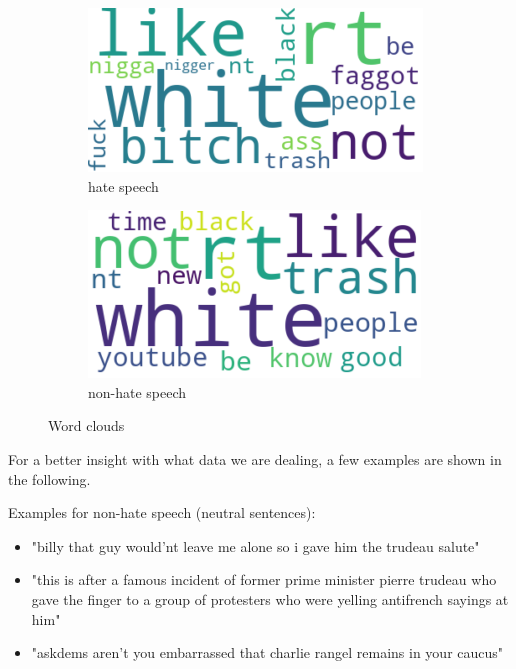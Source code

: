 \begin{figure}[ht]
    \hfill
    \begin{subfigure}[b]{0.4\textwidth}
        \centering
        \includegraphics[width=\textwidth]{figures/Wordcloud-HateSpeech-tokens.png}
        \caption{hate speech}
    \end{subfigure}
    \hfill
    \begin{subfigure}[b]{0.4\textwidth}
        \centering
        \includegraphics[width=\textwidth]{figures/Wordcloud-Non-HateSpeech-tokens.png}
        \caption{non-hate speech}
    \end{subfigure}
    \hfill
    \caption{Word clouds}
    \label{fig:wordclouds}
\end{figure}

For a better insight with what data we are dealing, a few examples are shown in the following.

\noindent
Examples for non-hate speech (neutral sentences):
\begin{itemize}
    \item "billy that guy would'nt leave me alone so i gave him the trudeau salute"
    \item "this is after a famous incident of former prime minister pierre trudeau who gave the finger to a group of protesters who were yelling antifrench sayings at him"
    \item "askdems aren't you embarrassed that charlie rangel remains in your caucus"
\end{itemize}

